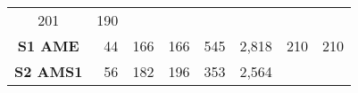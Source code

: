 \begin{longtable}[]{@{}crrrrrrr@{}}
\begin{minipage}[t]{0.08\columnwidth}
201\strut
\end{minipage} & \begin{minipage}[t]{0.14\columnwidth}\raggedleft\strut
190\strut
\end{minipage}\tabularnewline
\begin{minipage}[t]{0.10\columnwidth}\centering\strut
\textbf{S1 AME}\strut
\end{minipage} & \begin{minipage}[t]{0.11\columnwidth}\raggedleft\strut
44\strut
\end{minipage} & \begin{minipage}[t]{0.06\columnwidth}\raggedleft\strut
166\strut
\end{minipage} & \begin{minipage}[t]{0.13\columnwidth}\raggedleft\strut
166\strut
\end{minipage} & \begin{minipage}[t]{0.07\columnwidth}\raggedleft\strut
545\strut
\end{minipage} & \begin{minipage}[t]{0.09\columnwidth}\raggedleft\strut
2,818\strut
\end{minipage} & \begin{minipage}[t]{0.08\columnwidth}\raggedleft\strut
210\strut
\end{minipage} & \begin{minipage}[t]{0.14\columnwidth}\raggedleft\strut
210\strut
\end{minipage}\tabularnewline
\begin{minipage}[t]{0.10\columnwidth}\centering\strut
\textbf{S2 AMS1}\strut
\end{minipage} & \begin{minipage}[t]{0.11\columnwidth}\raggedleft\strut
56\strut
\end{minipage} & \begin{minipage}[t]{0.06\columnwidth}\raggedleft\strut
182\strut
\end{minipage} & \begin{minipage}[t]{0.13\columnwidth}\raggedleft\strut
196\strut
\end{minipage} & \begin{minipage}[t]{0.07\columnwidth}\raggedleft\strut
353\strut
\end{minipage} & \begin{minipage}[t]{0.09\columnwidth}\raggedleft\strut
2,564\strut
\end{minipage} & \begin{minipage}[t]{0.08\columnwidth}\raggedleft\strut

\end{minipage}
\end{longtable}
